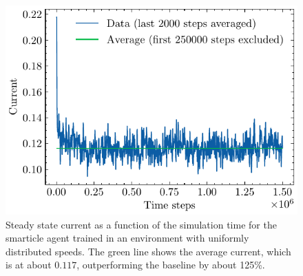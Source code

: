 \begin{figure}[h]
    \centering
    \includegraphics{uniform_speeds.pdf}
    \caption{Steady state current as a function of the simulation time for the smarticle agent trained in an environment with uniformly distributed speeds. The green line shows the average current, which is at about $0.117$, outperforming the baseline by about 125\%.}
    \label{fig:uniform_speeds}
\end{figure}

